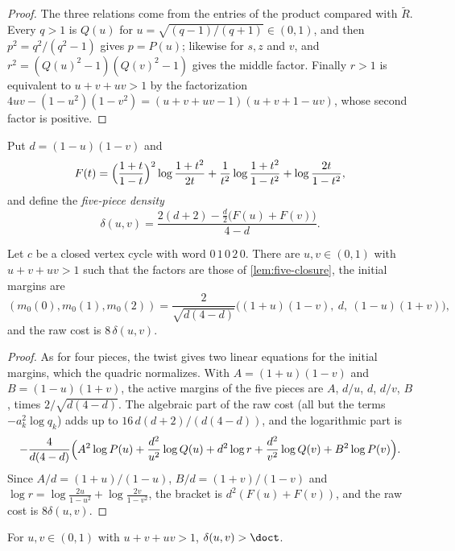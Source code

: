 \begin{proof}
The three relations come from the entries of the product compared with $\widetilde R$. Every
$q>1$ is $Q(u)$ for $u=\sqrt{(q-1)/(q+1)}\in(0,1)$, and then $p^2=q^2/(q^2-1)$ gives $p=P(u)$;
likewise for $s,z$ and $v$, and $r^2=(Q(u)^2-1)(Q(v)^2-1)$ gives the middle factor. Finally $r>1$
is equivalent to $u+v+uv>1$ by the factorization
$4uv-(1-u^2)(1-v^2)=(u+v+uv-1)(u+v+1-uv)$, whose second factor is positive.
\end{proof}

Put $d=(1-u)(1-v)$ and
\[
 F(t)=\Bigl(\frac{1+t}{1-t}\Bigr)^{2}\log\frac{1+t^2}{2t}+\frac{1}{t^2}\log\frac{1+t^2}{1-t^2}
 +\log\frac{2t}{1-t^2},
\]
and define the \emph{five-piece density}
\begin{equation}\label{eq:five-density}
 \delta(u,v)=\frac{2(d+2)-\tfrac{d}{2}\bigl(F(u)+F(v)\bigr)}{4-d}.
\end{equation}

\begin{lemma}\label{lem:five-param}
Let $c$ be a closed vertex cycle with word $0\,1\,0\,2\,0$. There are $u,v\in(0,1)$ with
$u+v+uv>1$ such that the factors are those of \cref{lem:five-closure}, the initial margins are
\[
 (m_0(0),m_0(1),m_0(2))=\frac{2}{\sqrt{d(4-d)}}\bigl((1+u)(1-v),\ d,\ (1-u)(1+v)\bigr),
\]
and the raw cost is $8\,\delta(u,v)$.
\end{lemma}

\begin{proof}
As for four pieces, the twist gives two linear equations for the initial margins, which the
quadric normalizes. With $A=(1+u)(1-v)$ and $B=(1-u)(1+v)$, the active margins of the five pieces
are $A$, $d/u$, $d$, $d/v$, $B$, times $2/\sqrt{d(4-d)}$. The algebraic part of the raw cost (all
but the terms $-a_k^2\log q_k$) adds up to $16\,d(d+2)/(d(4-d))$, and the logarithmic part is
\[
 -\frac{4}{d(4-d)}\Bigl(A^2\log P(u)+\frac{d^2}{u^2}\log Q(u)+d^2\log r+\frac{d^2}{v^2}\log Q(v)
 +B^2\log P(v)\Bigr).
\]
Since $A/d=(1+u)/(1-u)$, $B/d=(1+v)/(1-v)$ and
$\log r=\log\frac{2u}{1-u^2}+\log\frac{2v}{1-v^2}$, the bracket is $d^2(F(u)+F(v))$, and the
raw cost is $8\delta(u,v)$.
\end{proof}

\begin{theorem}\label{thm:five-density}
For $u,v\in(0,1)$ with $u+v+uv>1$, $\delta(u,v)>\doct$.
\end{theorem}

